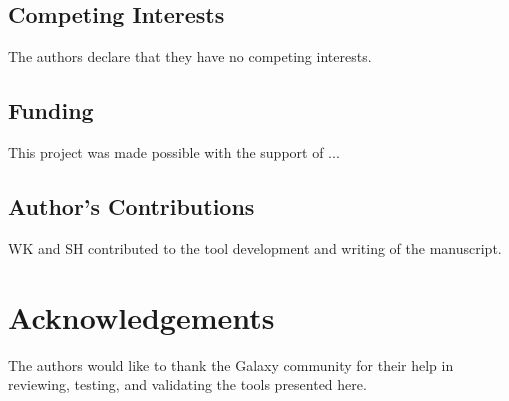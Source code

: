 \documentclass[a4paper,num-refs]{oup-contemporary}
\begin{document}
\subsection{Competing Interests}
The authors declare that they have no competing interests.

\subsection{Funding}
This project was made possible with the support of ...


\subsection{Author's Contributions}
WK and SH contributed to the tool development and writing of the manuscript.


\section{Acknowledgements}
The authors would like to thank the Galaxy community for their help in reviewing, testing, and validating the tools presented here.


\end{document}

